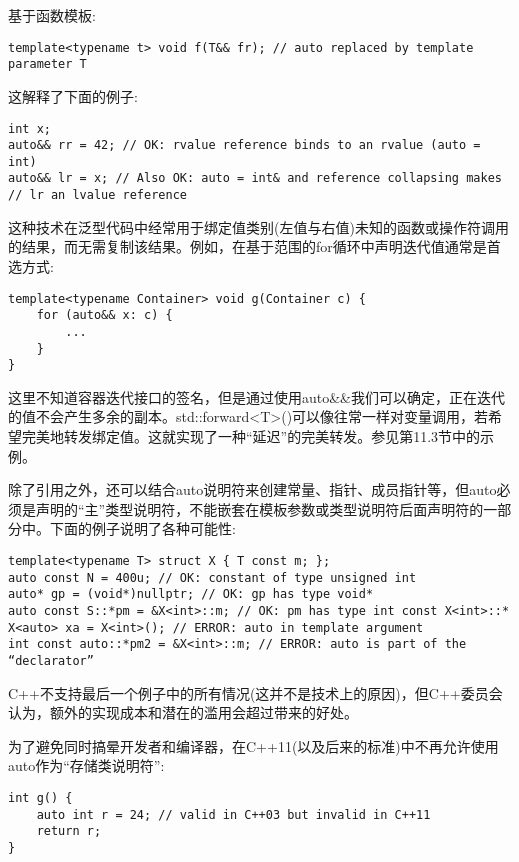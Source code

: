 基于函数模板:

\begin{lstlisting}[style=styleCXX]
template<typename t> void f(T&& fr); // auto replaced by template parameter T
\end{lstlisting}

这解释了下面的例子:

\begin{lstlisting}[style=styleCXX]
int x;
auto&& rr = 42; // OK: rvalue reference binds to an rvalue (auto = int)
auto&& lr = x; // Also OK: auto = int& and reference collapsing makes
// lr an lvalue reference
\end{lstlisting}

这种技术在泛型代码中经常用于绑定值类别(左值与右值)未知的函数或操作符调用的结果，而无需复制该结果。例如，在基于范围的for循环中声明迭代值通常是首选方式:

\begin{lstlisting}[style=styleCXX]
template<typename Container> void g(Container c) {
	for (auto&& x: c) {
		...
	}
}
\end{lstlisting}

这里不知道容器迭代接口的签名，但是通过使用auto\&\&我们可以确定，正在迭代的值不会产生多余的副本。std::forward<T>()可以像往常一样对变量调用，若希望完美地转发绑定值。这就实现了一种“延迟”的完美转发。参见第11.3节中的示例。

除了引用之外，还可以结合auto说明符来创建常量、指针、成员指针等，但auto必须是声明的“主”类型说明符，不能嵌套在模板参数或类型说明符后面声明符的一部分中。下面的例子说明了各种可能性:

\begin{lstlisting}[style=styleCXX]
template<typename T> struct X { T const m; };
auto const N = 400u; // OK: constant of type unsigned int
auto* gp = (void*)nullptr; // OK: gp has type void*
auto const S::*pm = &X<int>::m; // OK: pm has type int const X<int>::*
X<auto> xa = X<int>(); // ERROR: auto in template argument
int const auto::*pm2 = &X<int>::m; // ERROR: auto is part of the “declarator”
\end{lstlisting}

C++不支持最后一个例子中的所有情况(这并不是技术上的原因)，但C++委员会认为，额外的实现成本和潜在的滥用会超过带来的好处。

为了避免同时搞晕开发者和编译器，在C++11(以及后来的标准)中不再允许使用auto作为“存储类说明符”:

\begin{lstlisting}[style=styleCXX]
int g() {
	auto int r = 24; // valid in C++03 but invalid in C++11
	return r;
}
\end{lstlisting}

